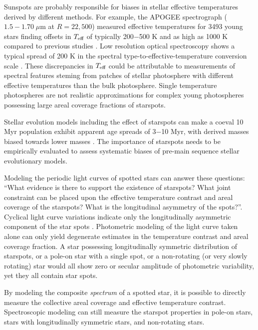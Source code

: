 \documentclass[onecolumn]{emulateapj}%
\begin{document}
Sunspots are probably responsible for biases in stellar effective temperatures derived by different methods.  For example, the APOGEE spectrograph ($1.5-1.70 \;\mu$m at $R=22,500$) measured effective temperatures for 3493 young stars finding offsets in $T_\textrm{eff}$ of typically 200$-$500 K and as high as 1000 K compared to previous studies \citep{2014ApJ...794..125C}.  Low resolution optical spectroscopy shows a typical spread of 200 K in the spectral type-to-effective-temperature conversion scale \citep{2014ApJ...786...97H}.  These discrepancies in $T_\textrm{eff}$ could be attributable to measurements of spectral features steming from patches of stellar photosphere with different effective temperatures than the bulk photosphere.  Single temperature photospheres are not realistic approximations for complex young photospheres possessing large areal coverage fractions of starspots.


Stellar evolution models including the effect of starspots can make a coeval 10 Myr population exhibit apparent age spreads of 3$-$10 Myr, with derived masses biased towards lower masses \citep{2015ApJ...807..174S}.  The importance of starspots needs to be empirically evaluated to assess systematic biases of pre-main sequence stellar evolutionary models.

Modeling the periodic light curves of spotted stars can answer these questions: ``What evidence is there to support the existence of starspots?  What joint constraint can be placed upon the effective temperature contrast and areal coverage of the starspots?  What is the longitudinal asymmetry of the spots?''.  Cyclical light curve variations indicate only the longitudinally asymmetric component of the star spots \citep{2012AJ....143....4H}.  Photometric modeling of the light curve taken alone can only yield degenerate estimates in the temperature contrast and areal coverage fraction.  A star possessing longitudinally symmetric distribution of starspots, or a pole-on star with a single spot, or a non-rotating (or very slowly rotating) star would all show zero or secular amplitude of photometric variability, yet they all contain star spots.  

By modeling the composite \emph{spectrum} of a spotted star, it is possible to directly measure the collective areal coverage and effective temperature contrast.  Spectroscopic modeling can still measure the starspot properties in pole-on stars, stars with longitudinally symmetric stars, and non-rotating stars.
\end{document}
